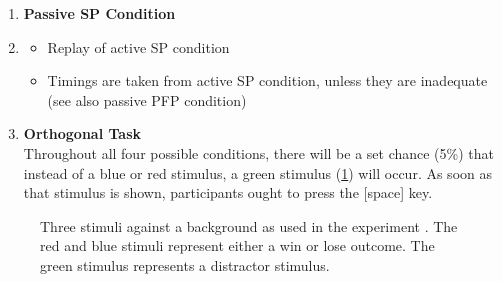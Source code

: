 \documentclass[
	12pt,
	oneside,
	bibliography=totocnumbered]{scrartcl}
\begin{document}
\begin{enumerate}
\item \textbf{Passive SP Condition} \\\item
\begin{itemize}
\item Replay of active SP condition
\item Timings are taken from active SP condition, unless they are inadequate (see also passive PFP condition)
\end{itemize}


\item \textbf{Orthogonal Task} \\
Throughout all four possible conditions, there will be a set chance (5\%) that instead of a blue or red stimulus, a green stimulus (\ref{fig:stimuli}) will occur. As soon as that stimulus is shown, participants ought to press the [space] key.
\end{enumerate} 








\begin{figure}[t]
\begin{center}

\captionsetup{width=.9\linewidth, format=plain}
\caption[Experimental Stimuli]{Three stimuli against a background as used in the experiment . The red and blue stimuli represent either a win or lose outcome. The green stimulus represents a distractor stimulus.}
\label{fig:stimuli}
\end{center}
\end{figure}

\clearpage
\printbibliography
\end{document}
